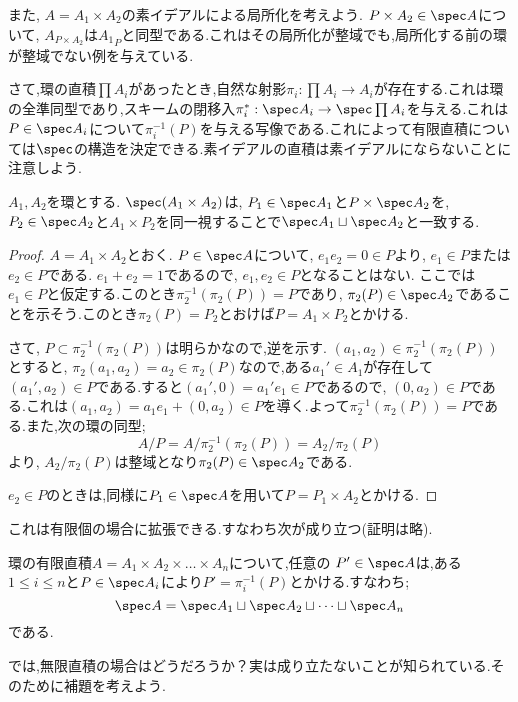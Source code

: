 また, $A=A_1\times A_2$の素イデアルによる局所化を考えよう. $P\times A_2\in\spec A$について, $A_{P\times A_2}$は${A_1}_{P}$と同型である.これはその局所化が整域でも,局所化する前の環が整域でない例を与えている.

さて,環の直積$\prod A_i$があったとき,自然な射影$\pi_i:\prod A_i\to A_i$が存在する.これは環の全準同型であり,スキームの閉移入$\pi_i^\ast:\spec A_i\to\spec\prod A_i$を与える.これは$P\in\spec A_i$について$\pi_i^{-1}(P)$を与える写像である.これによって有限直積については$\spec$の構造を決定できる.素イデアルの直積は素イデアルにならないことに注意しよう.
\begin{prop}
	$A_1,A_2$を環とする. $\spec (A_1\times A_2)$は, $P_1\in\spec A_1$と$P\times \spec A_2$を, $P_2\in\spec A_2$と$A_1\times P_2$を同一視することで$\spec A_1\sqcup\spec A_2$と一致する.
\end{prop}

\begin{proof}
	$A=A_1\times A_2$とおく. $P\in\spec A$について, $e_1e_2=0\in P$より, $e_1\in P$または$e_2\in P$である. $e_1+e_2=1$であるので, $e_1,e_2\in P$となることはない. ここでは$e_1\in P$と仮定する.このとき$\pi_2^{-1}(\pi_2(P))=P$であり, $\pi_2(P)\in\spec A_2$であることを示そう.このとき$\pi_2(P)=P_2$とおけば$P=A_1\times P_2$とかける.
	
	さて, $P\subset\pi_2^{-1}(\pi_2(P))$は明らかなので,逆を示す. $(a_1,a_2)
	\in\pi_2^{-1}(\pi_2(P))$とすると, $\pi_2(a_1,a_2)=a_2\in\pi_2(P)$なので,ある$a_1'\in A_1$が存在して$(a_1',a_2)\in P$である.すると$(a_1',0)=a_1'e_1\in P$であるので, $(0,a_2)\in P$である.これは$(a_1,a_2)=a_1e_1+(0,a_2)\in P$を導く.よって$\pi_2^{-1}(\pi_2(P))=P$である.また,次の環の同型;
	\[A/P=A/\pi_2^{-1}(\pi_2(P))=A_2/\pi_2(P)\]
	より, $A_2/\pi_2(P)$は整域となり$\pi_2(P)\in\spec A_2$である.
	
	$e_2\in P$のときは,同様に$P_1\in\spec A$を用いて$P=P_1\times A_2$とかける.
\end{proof}

これは有限個の場合に拡張できる.すなわち次が成り立つ(証明は略).

\begin{prop}
	環の有限直積$A=A_1\times A_2\times\dots\times A_n$について,任意の $P'\in\spec A$は,ある$1\leq i\leq n$と$P\in\spec A_i$により$P'=\pi_i^{-1}(P)$とかける.すなわち;
	\[\spec A=\spec A_1\sqcup\spec A_2\sqcup\dots\sqcup\spec A_n\]
	である.
\end{prop}

では,無限直積の場合はどうだろうか？実は成り立たないことが知られている.そのために補題を考えよう.

